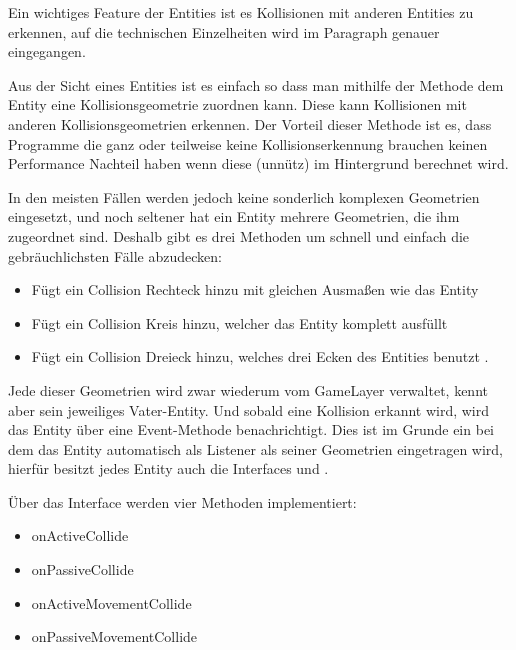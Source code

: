 Ein wichtiges Feature der Entities ist es Kollisionen mit anderen Entities zu erkennen, auf die technischen Einzelheiten wird im Paragraph  genauer eingegangen.

Aus der Sicht eines Entities ist es einfach so dass man mithilfe der Methode  dem Entity eine Kollisionsgeometrie zuordnen kann. Diese kann Kollisionen mit anderen Kollisionsgeometrien erkennen.
Der Vorteil dieser Methode ist es, dass Programme die ganz oder teilweise keine Kollisionserkennung brauchen keinen Performance Nachteil haben wenn diese (unnütz) im Hintergrund berechnet wird.

In den meisten Fällen werden jedoch keine sonderlich komplexen Geometrien eingesetzt, und noch seltener hat ein Entity mehrere Geometrien, die ihm zugeordnet sind.
Deshalb gibt es drei Methoden um schnell und einfach die gebräuchlichsten Fälle abzudecken:

\begin{itemize}
	\item {} Fügt ein Collision Rechteck hinzu mit gleichen Ausmaßen wie das Entity
	\item {} Fügt ein Collision Kreis hinzu, welcher das Entity komplett ausfüllt
	\item {} Fügt ein Collision Dreieck hinzu, welches drei Ecken des Entities benutzt .
\end{itemize}

Jede dieser Geometrien wird zwar wiederum vom GameLayer verwaltet, kennt aber sein jeweiliges Vater-Entity. Und sobald eine Kollision erkannt wird, wird das Entity über eine Event-Methode benachrichtigt. Dies ist im Grunde ein  bei dem das Entity automatisch als Listener als seiner Geometrien eingetragen wird, hierfür besitzt jedes Entity auch die Interfaces  und .

Über das Interface  werden vier Methoden implementiert:

\begin{itemize}
	\item onActiveCollide
	\item onPassiveCollide
	\item onActiveMovementCollide
	\item onPassiveMovementCollide
\end{itemize}

